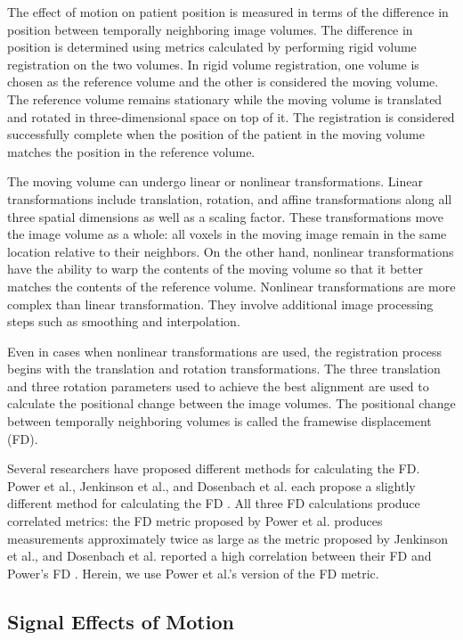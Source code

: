 The effect of motion on patient position is measured in terms of the difference in position between temporally neighboring image volumes. The difference in position is determined using metrics calculated by performing rigid volume registration on the two volumes. 
In rigid volume registration, one volume is chosen as the reference volume and the other is considered the moving volume. The reference volume remains stationary while the moving volume is translated and rotated in three-dimensional space on top of it. The registration is considered successfully complete when the position of the patient in the moving volume matches the position in the reference volume. %

The moving volume can undergo linear or nonlinear transformations. Linear transformations include translation, rotation, and affine transformations along all three spatial dimensions as well as a scaling factor. These transformations move the image volume as a whole: all voxels in the moving image remain in the same location relative to their neighbors. On the other hand, nonlinear transformations have the ability to warp the contents of the moving volume so that it better matches the contents of the reference volume. Nonlinear transformations are more complex than linear transformation. They involve additional image processing steps such as smoothing and interpolation.

Even in cases when nonlinear transformations are used, the registration process begins with the translation and rotation transformations. The three translation and three rotation parameters used to achieve the best alignment are used to calculate the positional change between the image volumes. The positional change between temporally neighboring volumes is called the framewise displacement (FD).  

Several researchers have proposed different methods for calculating the FD. Power et al., Jenkinson et al., and Dosenbach et al. each propose a slightly different method for calculating the FD \cite{Power2012} \cite{Jenkinson2002} \cite{Dosenbach2017}. All three FD calculations produce correlated metrics: the FD metric proposed by Power et al. produces measurements approximately twice as large as the metric proposed by Jenkinson et al., and Dosenbach et al. reported a high correlation between their FD and Power’s FD \cite{Yan2013a} \cite{Dosenbach2017}. Herein, we use Power et al.'s version of the FD metric.

\subsection{Signal Effects of Motion}

